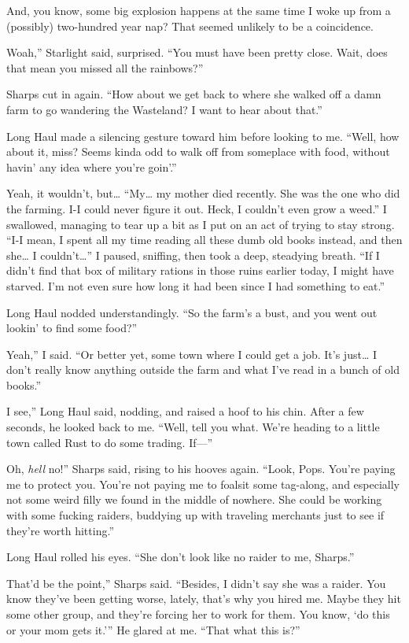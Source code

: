And, you know, some big explosion happens at the same time I woke up from a (possibly) two-hundred year nap? That seemed unlikely to be a coincidence.

\leavevmode{}Woah,” Starlight said, surprised. “You must have been pretty close. Wait, does that mean you missed all the rainbows?”

Sharps cut in again. “How about we get back to where she walked off a damn farm to go wandering the Wasteland? I want to hear about that.”

Long Haul made a silencing gesture toward him before looking to me. “Well, how about it, miss? Seems kinda odd to walk off from someplace with food, without havin’ any idea where you’re goin’.”

Yeah, it wouldn’t, but… “My… my mother died recently. She was the one who did the farming. I-I could never figure it out. Heck, I couldn’t even grow a weed.” I swallowed, managing to tear up a bit as I put on an act of trying to stay strong. “I-I mean, I spent all my time reading all these dumb old books instead, and then she… I couldn’t…” I paused, sniffing, then took a deep, steadying breath. “If I didn’t find that box of military rations in those ruins earlier today, I might have starved. I’m not even sure how long it had been since I had something to eat.”

Long Haul nodded understandingly. “So the farm’s a bust, and you went out lookin’ to find some food?”

\leavevmode{}Yeah,” I said. “Or better yet, some town where I could get a job. It’s just… I don’t really know anything outside the farm and what I’ve read in a bunch of old books.”

\leavevmode{}I see,” Long Haul said, nodding, and raised a hoof to his chin. After a few seconds, he looked back to me. “Well, tell you what. We’re heading to a little town called Rust to do some trading. If—”

\leavevmode{}Oh, \textit{hell} no!” Sharps said, rising to his hooves again. “Look, Pops. You’re paying me to protect you. You’re not paying me to foalsit some tag-along, and especially not some weird filly we found in the middle of nowhere. She could be working with some fucking raiders, buddying up with traveling merchants just to see if they’re worth hitting.”

Long Haul rolled his eyes. “She don’t look like no raider to me, Sharps.”

\leavevmode{}That’d be the point,” Sharps said. “Besides, I didn’t say she was a raider. You know they’ve been getting worse, lately, that’s why you hired me. Maybe they hit some other group, and they’re forcing her to work for them. You know, ‘do this or your mom gets it.’” He glared at me. “That what this is?”

